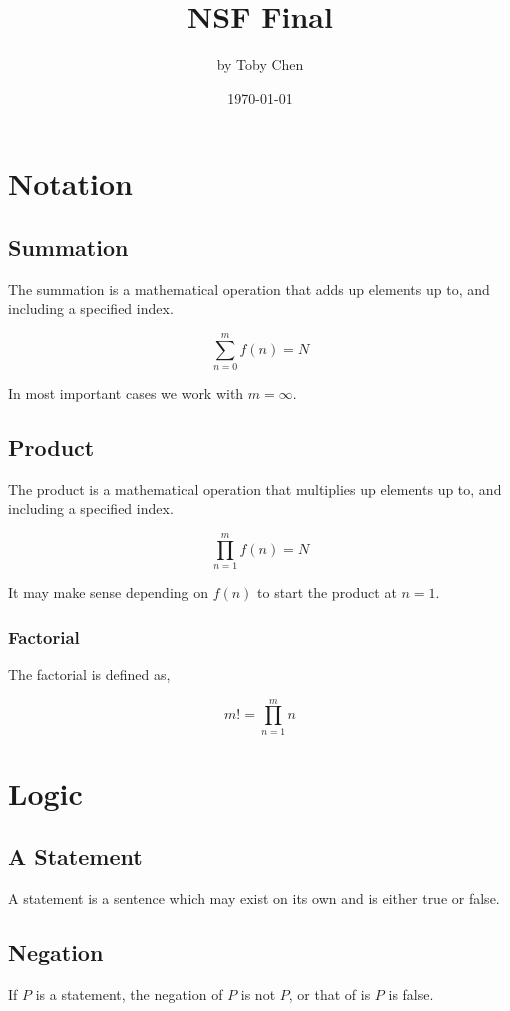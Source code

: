 \documentclass{article}
\title{NSF Final}
\author{by Toby Chen}
\date{\today}
\begin{document}
    \maketitle

    \section{Notation}

        \subsection{Summation}
            The summation is a mathematical operation that adds up elements up to, and including a specified index.

            \[\sum_{n = 0}^{m} f(n) = N\]

            In most important cases we work with $m = \infty$.

        \subsection{Product}
            The product is a mathematical operation that multiplies up elements up to, and including a specified  index.

            \[\prod_{n = 1}^{m} f(n) = N\]

            It may make sense depending on $f(n)$ to start the product at $n=1$.

            \subsubsection{Factorial}
                The factorial is defined as,

                \[m! = \prod_{n = 1}^{m}n\]

    \section{Logic}
        \subsection{A Statement}
            A statement is a sentence which may exist on its own and is either true or false.

        \subsection{Negation}
            If $P$ is a statement, the negation of $P$ is not $P$, or that of is $P$ is false.\\
\end{document}
